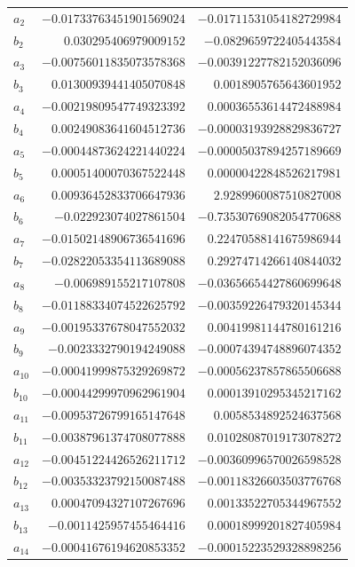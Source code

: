 \documentclass[11pt]{article}
\theoremstyle{definition}
\begin{document}
{\begin{longtable}{lrr}
$a_{2}$ & $-0.01733763451901569024$ & $-0.01711531054182729984$\\
$b_{2}$ & $0.030295406979009152$ & $-0.0829659722405443584$\\
$a_{3}$ & $-0.00756011835073578368$ & $-0.00391227782152036096$\\
$b_{3}$ & $0.01300939441405070848$ & $0.0018905765643601952$\\
$a_{4}$ & $-0.00219809547749323392$ & $0.00036553614472488984$\\
$b_{4}$ & $0.00249083641604512736$ & $-0.00003193928829836727$\\
$a_{5}$ & $-0.00044873624221440224$ & $-0.00005037894257189669$\\
$b_{5}$ & $0.00051400070367522448$ & $0.00000422848526217981$\\
$a_{6}$ & $0.00936452833706647936$ & $2.9289960087510827008$\\
$b_{6}$ & $-0.022923074027861504$ & $-0.73530769082054770688$\\
$a_{7}$ & $-0.01502148906736541696$ & $0.22470588141675986944$\\
$b_{7}$ & $-0.02822053354113689088$ & $0.29274714266140844032$\\
$a_{8}$ & $-0.006989155217107808$ & $-0.03656654427860699648$\\
$b_{8}$ & $-0.01188334074522625792$ & $-0.00359226479320145344$\\
$a_{9}$ & $-0.00195337678047552032$ & $0.00419981144780161216$\\
$b_{9}$ & $-0.0023332790194249088$ & $-0.00074394748896074352$\\
$a_{10}$ & $-0.00041999875329269872$ & $-0.00056237857865506688$\\
$b_{10}$ & $-0.00044299970962961904$ & $0.00013910295345217162$\\
$a_{11}$ & $-0.00953726799165147648$ & $0.0058534892524637568$\\
$b_{11}$ & $-0.00387961374708077888$ & $0.01028087019173078272$\\
$a_{12}$ & $-0.00451224426526211712$ & $-0.00360996570026598528$\\
$b_{12}$ & $-0.00353323792150087488$ & $-0.00118326603503776768$\\
$a_{13}$ & $0.00047094327107267696$ & $0.00133522705344967552$\\
$b_{13}$ & $-0.0011425957455464416$ & $0.00018999201827405984$\\
$a_{14}$ & $-0.00041676194620853352$ & $-0.00015223529328898256$\\

\end{longtable}}
\end{document}
